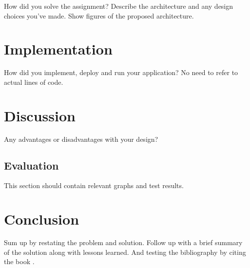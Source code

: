How did you solve the assignment? Describe the architecture and any design choices you've made. Show figures of the proposed architecture.

\section{Implementation}

How did you implement, deploy and run your application? No need to refer to actual lines of code.

\section{Discussion}

Any advantages or disadvantages with your design?

\subsection{Evaluation}

This section should contain relevant graphs and test results.

\section{Conclusion}

Sum up by restating the problem and solution. Follow up with a brief summary of the solution along with lessons learned.
And testing the bibliography by citing the book \cite{robert98}.



\newpage{}





